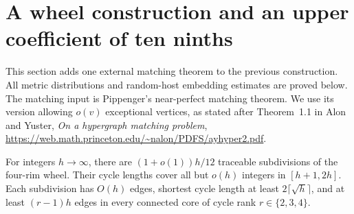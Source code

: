 \section{A wheel construction and an upper coefficient of ten ninths}
\label{sec:rhost-ten-ninths}

This section adds one external matching theorem to the previous construction.
All metric distributions and random-host embedding estimates are proved below.
The matching input is Pippenger's near-perfect matching theorem.
We use its version allowing $o(v)$ exceptional vertices, as stated after Theorem~1.1 in
Alon and Yuster, \emph{On a hypergraph matching problem},
\url{https://web.math.princeton.edu/~nalon/PDFS/ayhyper2.pdf}.

\begin{lemma}\label{lem:rhost-wheel-lengths}
For integers $h\to\infty$, there are $(1+o(1))h/12$ traceable subdivisions of the four-rim wheel.
Their cycle lengths cover all but $o(h)$ integers in $[h+1,2h]$.
Each subdivision has $O(h)$ edges, shortest cycle length at least $2\lceil\sqrt h\rceil$,
and at least $(r-1)h$ edges in every connected core of cycle rank $r\in\{2,3,4\}$.
\end{lemma}

